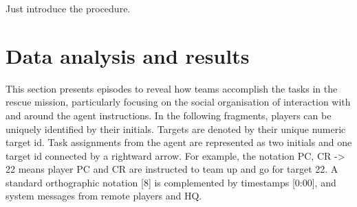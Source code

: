 


Just introduce the procedure.\\

\section{Data analysis and results}

This section presents episodes to reveal how teams accomplish the tasks in the rescue mission, particularly focusing on the social organisation of interaction with and around the agent instructions. In the following fragments, players can be uniquely identified by their initials. Targets are denoted by their unique numeric target id. Task assignments from the agent are represented as two initials and one target id connected by a rightward arrow. For example, the notation PC, CR -> 22 means player PC and CR are instructed to team up and go for target 22. A standard orthographic notation [8] is complemented by timestamps [0:00], and system messages from remote players and HQ.  

